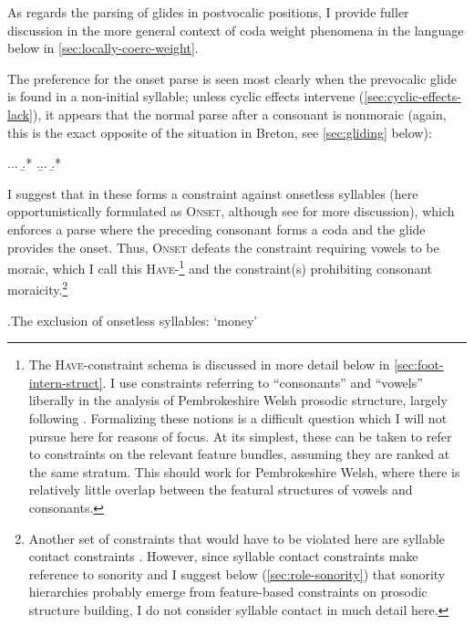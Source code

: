 As regards the parsing of glides in postvocalic positions, I provide fuller discussion in the more general context of coda weight phenomena in the language below in \cref{sec:locally-coerc-weight}.

The preference for the onset parse is seen most clearly when the prevocalic glide is found in a non-initial syllable; unless cyclic effects intervene (\cref{sec:cyclic-effects-lack}), it appears that the normal parse after a consonant is nonmoraic (again, this is the exact opposite of the situation in Breton, see \cref{sec:gliding} below):

\ex.\a.\a.
\b.*\mbi{[peˈduːar]}
\z.\b.\a.
\b.*\mbi{[aˈriːan]}

I suggest that in these forms a constraint against onsetless syllables (here opportunistically formulated as \textsc{Onset}, although see \citealp{smith12:_korean} for more discussion), which enforces a parse where the preceding consonant forms a coda and the glide provides the onset. Thus, \textsc{Onset} defeats the constraint requiring vowels to be moraic, which I call this \textsc{Have}-\mo[V]\footnote{The \textsc{Have}-\mo constraint schema is discussed in more detail below in \cref{sec:foot-intern-struct}. I use constraints referring to \enquote{consonants} and \enquote{vowels} liberally in the analysis of Pembrokeshire Welsh prosodic structure, largely following \citet{moren01:_distin}. Formalizing these notions is a difficult question which I will not pursue here for reasons of focus. At its simplest, these can be taken to refer to constraints on the relevant feature bundles, assuming they are ranked at the same stratum. This should work for Pembrokeshire Welsh, where there is relatively little overlap between the featural structures of vowels and consonants.} and the constraint(s) prohibiting consonant moraicity.\footnote{Another set of constraints that would have to be violated here are syllable contact constraints \citep[\egm][]{murray83:_sound_german,vennemann88:_prefer,gouskova04:_relat_optim_theor}. However, since syllable contact constraints make reference to sonority and I suggest below (\cref{sec:role-sonority}) that sonority hierarchies probably emerge from feature\hyp based constraints on prosodic structure building, I do not consider syllable contact in much detail here.}

\ex.The exclusion of onsetless syllables: \ipa{[ˈarjan]} `money'\\
\begin{OTtableau}{3}
\end{OTtableau}

